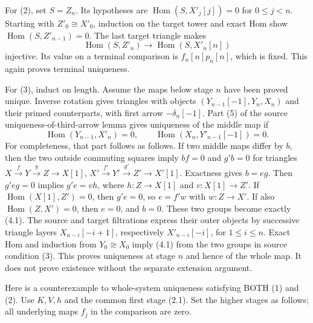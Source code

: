For (2)\allowbreak{},\allowbreak{} set \(S=Z_n\). Its hypotheses are \(\operatorname{Hom}(S,X'_j[j])=0\) for \(0\leq j<n\). Starting with \(Z'_0\cong X'_0\),\allowbreak{} induction on the target tower and exact Hom show \(\operatorname{Hom}(S,Z'_{n-1})=0\). The last target triangle makes \[
\operatorname{Hom}(S,Z'_n)\longrightarrow\operatorname{Hom}(S,X'_n[n])
\] injective. Its value on a terminal comparison is \(f_n[n]p_n[n]\),\allowbreak{} which is fixed. This again proves terminal uniqueness.

For (3)\allowbreak{},\allowbreak{} induct on length. Assume the maps below stage \(n\) have been proved unique. Inverse rotation gives triangles with objects \((Y_{n-1}[-1],Y_n,X_n)\) and their primed counterparts,\allowbreak{} with first arrow \(-\delta_n[-1]\). Part (5)\allowbreak{} of the source uniqueness-of-third-arrow lemma gives uniqueness of the middle map if \[
\operatorname{Hom}(Y_{n-1},X'_n)=0,\qquad
\operatorname{Hom}(X_n,Y'_{n-1}[-1])=0. \tag{4.1}
\] For completeness,\allowbreak{} that part follows as follows. If two middle maps differ by \(b\),\allowbreak{} then the two outside commuting squares imply \(bf=0\) and \(g'b=0\) for triangles \(X\xrightarrow fY\xrightarrow gZ\to X[1]\),\allowbreak{} \(X'\xrightarrow {f'}Y'\xrightarrow {g'}Z'\to X'[1]\). Exactness gives \(b=eg\). Then \(g'eg=0\) implies \(g'e=vh\),\allowbreak{} where \(h:Z\to X[1]\) and \(v:X[1]\to Z'\). If \(\operatorname{Hom}(X[1],Z')=0\),\allowbreak{} then \(g'e=0\),\allowbreak{} so \(e=f'w\) with \(w:Z\to X'\). If also \(\operatorname{Hom}(Z,X')=0\),\allowbreak{} then \(e=0\),\allowbreak{} and \(b=0\). These two groups become exactly (4.1)\allowbreak{}. The source and target filtrations express their outer objects by successive triangle layers \(X_{n-i}[-i+1]\),\allowbreak{} respectively \(X'_{n-i}[-i]\),\allowbreak{} for \(1\leq i\leq n\). Exact Hom and induction from \(Y_0\cong X_0\) imply (4.1)\allowbreak{} from the two groups in source condition (3)\allowbreak{}. This proves uniqueness at stage \(n\) and hence of the whole map. It does not prove existence without the separate extension argument.

Here is a counterexample to whole-system uniqueness satisfying BOTH (1)\allowbreak{} and (2)\allowbreak{}. Use \(K,V,h\) and the common first stage (2.1)\allowbreak{}. Set the higher stages as follows; all underlying maps \(f_j\) in the comparison are zero.

